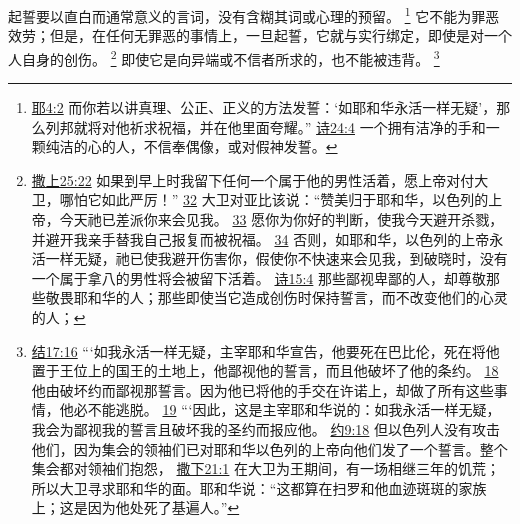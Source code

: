 \documentclass[12pt, a4paper, oneside]{ctexart}
\newcounter{parnum}[section]
\newcommand{\N}{%
   \noindent\refstepcounter{parnum}%
    \makebox[\parindent][l]{\textbf{\arabic{parnum}.}}}
\begin{document}
\N 起誓要以直白而通常意义的言词，没有含糊其词或心理的预留。
	\footnote {
		\href{https://biblehub.com/jeremiah/4-2.htm}{耶4:2} 而你若以讲真理、公正、正义的方法发誓：‘如耶和华永活一样无疑’，那么列邦就将对他祈求祝福，并在他里面夸耀。”
		\href{https://biblehub.com/psalms/24-4.htm}{诗24:4} 一个拥有洁净的手和一颗纯洁的心的人，不信奉偶像，或对假神发誓。
	}
	它不能为罪恶效劳；但是，在任何无罪恶的事情上，一旦起誓，它就与实行绑定，即使是对一个人自身的创伤。
	\footnote {
		\href{https://biblehub.com/1_samuel/25-22.htm}{撒上25:22} 如果到早上时我留下任何一个属于他的男性活着，愿上帝对付大卫，哪怕它如此严厉！”
		\href{https://biblehub.com/1_samuel/25-32.htm}{32} 大卫对亚比该说：“赞美归于耶和华，以色列的上帝，今天祂已差派你来会见我。
		\href{https://biblehub.com/1_samuel/25-33.htm}{33} 愿你为你好的判断，使我今天避开杀戮，并避开我亲手替我自己报复而被祝福。
		\href{https://biblehub.com/1_samuel/25-34.htm}{34} 否则，如耶和华，以色列的上帝永活一样无疑，祂已使我避开伤害你，假使你不快速来会见我，到破晓时，没有一个属于拿八的男性将会被留下活着。
		\href{https://biblehub.com/psalms/15-4.htm}{诗15:4} 那些鄙视卑鄙的人，却尊敬那些敬畏耶和华的人；那些即使当它造成创伤时保持誓言，而不改变他们的心灵的人；
	}
	即使它是向异端或不信者所求的，也不能被违背。
	\footnote {
		\href{https://biblehub.com/ezekiel/17-16.htm}{结17:16} “‘如我永活一样无疑，主宰耶和华宣告，他要死在巴比伦，死在将他置于王位上的国王的土地上，他鄙视他的誓言，而且他破坏了他的条约。
		\href{https://biblehub.com/ezekiel/17-18.htm}{18} 他由破坏约而鄙视那誓言。因为他已将他的手交在许诺上，却做了所有这些事情，他必不能逃脱。
		\href{https://biblehub.com/ezekiel/17-19.htm}{19} “‘因此，这是主宰耶和华说的：如我永活一样无疑，我会为鄙视我的誓言且破坏我的圣约而报应他。
		\href{https://biblehub.com/joshua/9-18.htm}{约9:18} 但以色列人没有攻击他们，因为集会的领袖们已对耶和华以色列的上帝向他们发了一个誓言。整个集会都对领袖们抱怨，
		\href{https://biblehub.com/2_samuel/21-1.htm}{撒下21:1} 在大卫为王期间，有一场相继三年的饥荒；所以大卫寻求耶和华的面。耶和华说：“这都算在扫罗和他血迹斑斑的家族上；这是因为他处死了基遍人。”
	}
\end{document}
